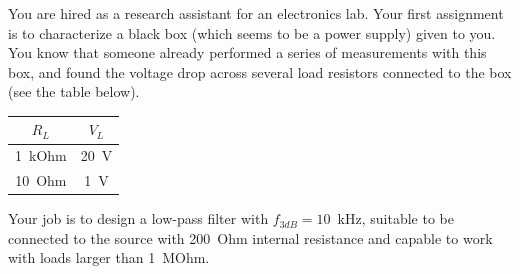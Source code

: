 \documentclass[letterpaper,addpoints,answers]{exam}
\begin{document}
\begin{questions}
\pagebreak

\question
You are hired as a research assistant for an electronics lab. Your first
assignment is to characterize a black box (which seems to be a power
supply) given to you.  
You know that someone already performed a series of measurements
with this box, and found the voltage drop across several load resistors
connected to the box (see the table below).

\begin{tabular}{|c|c|}
\hline$R_L$	  &  $V_L$ \\ 
\hline
1~kOhm	&  20~V \\
10~Ohm &  1~V \\
\hline
\end{tabular}


\pagebreak
\question
Your job is to design a low-pass filter with $f_{3dB}=10$~kHz, suitable to
be connected to the source with 200~Ohm internal resistance and capable to
work with loads larger than 1~MOhm.

\end{questions}
\end{document}
